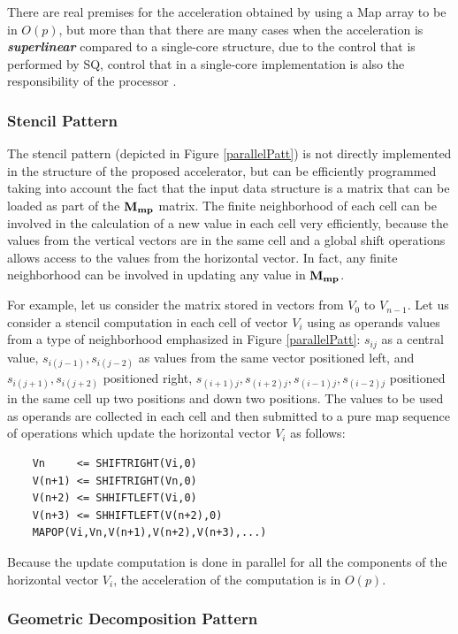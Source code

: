There are real premises for the acceleration obtained by using a Map array to be in $O(p)$, but more than that there are many cases when the acceleration is  {\bf {\em superlinear}} compared to a single-core structure, due to the control that is performed by SQ, control that in a single-core implementation is also the responsibility of the processor \cite{antonescu24a}.

\subsubsection{Stencil Pattern}

The stencil pattern (depicted in  Figure \ref{parallelPatt}) is not directly implemented in the structure of the proposed accelerator, but can be efficiently programmed taking into account the fact that the input data structure is a matrix that can be loaded as part of the ${\bf M_{mp}}$ matrix. The finite neighborhood of each cell can be involved in the calculation of a new value in each cell very efficiently, because the values from the vertical vectors are in the same cell and a global shift operations allows access to the values from the horizontal vector. In fact, any finite neighborhood can be involved in updating  any value in ${\bf M_{mp}}$.

For example, let us consider the matrix stored in vectors from $V_0$ to $V_{n-1}$. Let us  consider a stencil computation in each cell of vector $V_i$ using as operands values from a type of neighborhood emphasized in Figure \ref{parallelPatt}: $s_{ij}$ as a central value, $s_{i(j-1)}, s_{i(j-2)}$ as values from the same vector positioned left, and $s_{i(j+1)}, s_{i(j+2)}$ positioned right, $s_{(i+1)j}, s_{(i+2)j}, s_{(i-1)j}, s_{(i-2)j}$ positioned in the same cell up two positions and down two positions.  The values to be used as operands are collected  in each cell and then submitted to a pure map sequence of operations which update the horizontal vector $V_i$ as follows:
\begin{verbatim}
    Vn     <= SHIFTRIGHT(Vi,0)
    V(n+1) <= SHIFTRIGHT(Vn,0)
    V(n+2) <= SHHIFTLEFT(Vi,0)
    V(n+3) <= SHHIFTLEFT(V(n+2),0)
    MAPOP(Vi,Vn,V(n+1),V(n+2),V(n+3),...)
\end{verbatim}
Because the update computation is done in parallel  for all the components of the horizontal vector $V_i$, the acceleration of the computation is in $O(p)$.

\subsubsection{Geometric Decomposition  Pattern}

